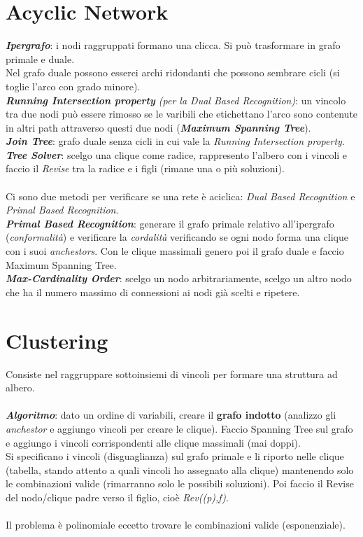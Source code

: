 \documentclass[a4paper, notitlepage, 9pt]{extreport}
\begin{document}
\section*{Acyclic Network}
\textit{\textbf{Ipergrafo}}: i nodi raggruppati formano una clicca. Si può trasformare in grafo primale e duale.\\
Nel grafo duale possono esserci archi ridondanti che possono sembrare cicli (si toglie l'arco con grado minore).\\
\textit{\textbf{Running Intersection property} (per la Dual Based Recognition)}: un vincolo tra due nodi può essere rimosso se le varibili che etichettano l'arco sono contenute in altri path attraverso questi due nodi (\textbf{\textit{Maximum Spanning Tree}}).\\
\textit{\textbf{Join Tree}}: grafo duale senza cicli in cui vale la \textit{Running Intersection property}.\\
\textit{\textbf{Tree Solver}}: scelgo una clique come radice, rappresento l'albero con i vincoli e faccio il \textit{Revise} tra la radice e i figli (rimane una o più soluzioni).\\\\
Ci sono due metodi per verificare se una rete è aciclica: \textit{Dual Based Recognition} e \textit{Primal Based Recognition}.\\
\textit{\textbf{Primal Based Recognition}}: generare il grafo primale relativo all'ipergrafo (\textit{conformalità}) e verificare la \textit{cordalità} verificando se ogni nodo forma una clique con i suoi \textit{anchestors}. Con le clique massimali genero poi il grafo duale e faccio Maximum Spanning Tree.\\
\textit{\textbf{Max-Cardinality Order}}: scelgo un nodo arbitrariamente, scelgo un altro nodo che ha il numero massimo di connessioni ai nodi già scelti e ripetere.


\section*{Clustering}
Consiste nel raggruppare sottoinsiemi di vincoli per formare una struttura ad albero.\\\\
\textit{\textbf{Algoritmo}}: dato un ordine di variabili, creare il \textbf{grafo indotto} (analizzo gli \textit{anchestor} e aggiungo vincoli per creare le clique). Faccio Spanning Tree sul grafo e aggiungo i vincoli corrispondenti alle clique massimali (mai doppi).\\
Si specificano i vincoli (disguaglianza) sul grafo primale e li riporto nelle clique (tabella, stando attento a quali vincoli ho assegnato alla clique) mantenendo solo le combinazioni valide (rimarranno solo le possibili soluzioni). Poi faccio il Revise del nodo/clique padre verso il figlio, cioè \textit{Rev((p),f)}.\\\\
Il problema è polinomiale eccetto trovare le combinazioni valide (esponenziale).
\end{document}
